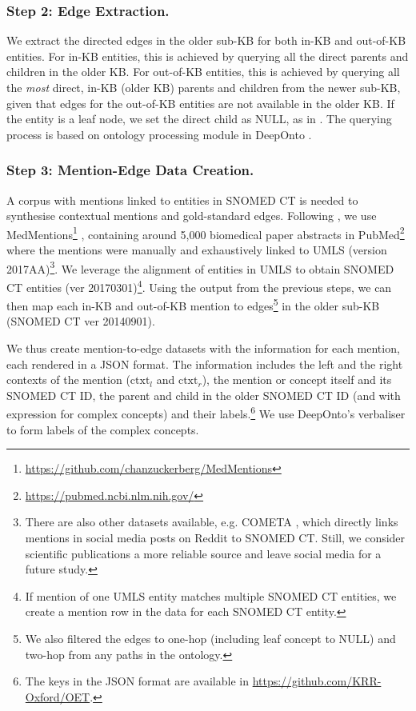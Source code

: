 \documentclass[sigconf]{acmart}
\begin{document}
\subsubsection*{Step 2: Edge Extraction.}
We extract the directed edges in the older sub-KB for both in-KB and out-of-KB entities. For in-KB entities, this is achieved by querying all the direct parents and children in the older KB. For out-of-KB entities, this is achieved by querying all the \textit{most} direct, in-KB (older KB) parents and children from the newer sub-KB, given that edges for the out-of-KB entities are not available in the older KB. If the entity is a leaf node, we set the direct child as NULL, as in \citet{zhang2021TMN}. The querying process is based on ontology processing module in DeepOnto \cite{he2023deeponto}.

\subsubsection*{Step 3: Mention-Edge Data Creation.}
A corpus with mentions linked to entities in SNOMED CT is needed to synthesise contextual mentions and gold-standard edges. Following \citet{dong2023NIL}, we use MedMentions\footnote{\url{https://github.com/chanzuckerberg/MedMentions}} \cite{Mohan2019medmentions}, containing around 5,000 biomedical paper abstracts in PubMed\footnote{\url{https://pubmed.ncbi.nlm.nih.gov/}} where the mentions were manually and exhaustively linked to UMLS \cite{Bodenreider2004umls} (version 2017AA)\footnote{There are also other datasets available, e.g. COMETA \cite{basaldella2020cometa}, which directly links mentions in social media posts on Reddit to SNOMED CT. Still, we consider scientific publications a more reliable source and leave social media for a future study.}. We leverage the alignment of entities in UMLS to obtain  SNOMED CT entities (ver 20170301)\footnote{If mention of one UMLS entity matches multiple SNOMED CT entities, we create a mention row in the data for each SNOMED CT entity.}. Using the output from the previous steps, we can then map each in-KB and out-of-KB mention to edges\footnote{We also filtered the edges to one-hop (including leaf concept to NULL) and two-hop from any paths in the ontology.} in the older sub-KB (SNOMED CT ver 20140901).

We thus create mention-to-edge datasets with the information for each mention, each rendered in a JSON format. The information includes the left and the right contexts of the mention ($\text{ctxt}_l$ and $\text{ctxt}_r$), the mention or concept itself and its SNOMED CT ID, the parent and child in the older SNOMED CT ID (and with expression for complex concepts) and their labels.\footnote{The keys in the JSON format are available in \url{https://github.com/KRR-Oxford/OET}.} We use DeepOnto's verbaliser \cite{he2023deeponto,yuan2023ontolama} to form labels of the complex concepts.
\end{document}
